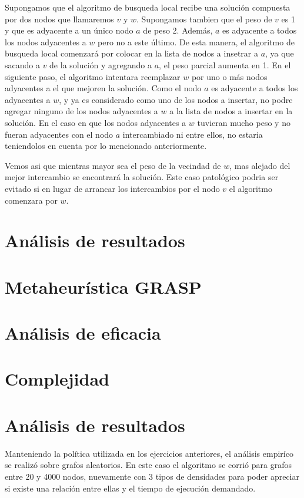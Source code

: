 \documentclass[a4paper,11pt] {article}
\begin{document}
Supongamos que el algoritmo de busqueda local recibe una soluci\'on compuesta por dos nodos que llamaremos $v$ y $w$. Supongamos tambien que el peso de $v$ es 1 y que es adyacente a un \'unico nodo $a$ de peso 2. Adem\'as, $a$ es adyacente a todos los nodos adyacentes a $w$ pero no a este \'ultimo. De esta manera, el algoritmo de busqueda local comenzar\'a por colocar en la lista de nodos a insetrar a $a$, ya que sacando a $v$ de la soluci\'on y agregando a $a$, el peso parcial aumenta en 1. En el siguiente paso, el algoritmo intentara reemplazar $w$ por uno o m\'as nodos adyacentes a el que mejoren la soluci\'on. Como el nodo $a$ es adyacente a todos los adyacentes a $w$, y ya es considerado como uno de los nodos a insertar, no podre agregar ninguno de los nodos adyacentes a $w$ a la lista de nodos a insertar en la soluci\'on. En el caso en que los nodos adyacentes a $w$ tuvieran mucho peso y no fueran adyacentes con el nodo $a$ intercambiado ni entre ellos, no estaria teniendolos en cuenta por lo mencionado anteriormente.

Vemos asi que mientras mayor sea el peso de la vecindad de $w$, mas alejado del mejor intercambio se encontrar\'a la soluci\'on. Este caso patol\'ogico podria ser evitado si en lugar de arrancar los intercambios por el nodo $v$ el algoritmo comenzara por $w$.

\section*{An\'alisis de resultados}

\section{Metaheur\'istica GRASP}

\section*{An\'alisis de eficacia}

\section*{Complejidad}

\section*{An\'alisis de resultados}

Manteniendo la política utilizada en los ejercicios anteriores, el análisis empiríco se realizó sobre grafos aleatorios. En este caso el algoritmo se corrió para grafos entre 20 y 4000 nodos, nuevamente con 3 tipos de densidades
para poder apreciar si existe una relación entre ellas y el tiempo de ejecución demandado.
\end{document}

